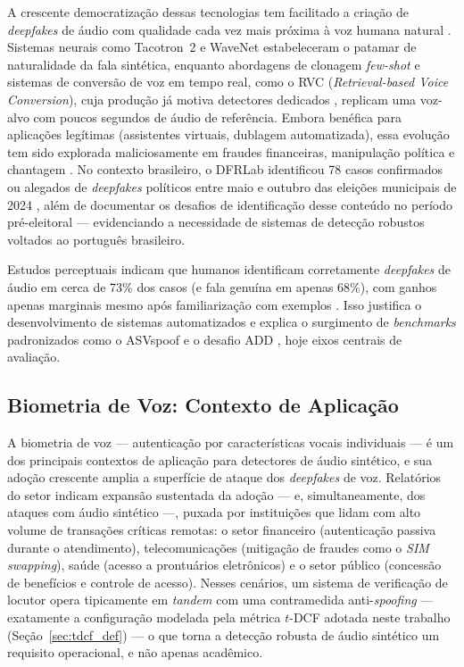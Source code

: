 \documentclass[12pt,a4paper]{article}
\begin{document}
A crescente democratização dessas tecnologias tem facilitado a criação de
\textit{deepfakes} de áudio com qualidade cada vez mais próxima à voz humana
natural \cite{mai2023warning, heidari2024deepfake}. Sistemas neurais como
Tacotron~2 \cite{shen2018natural} e WaveNet \cite{oord2016wavenet}
estabeleceram o patamar de naturalidade da fala sintética, enquanto abordagens
de clonagem \textit{few-shot} \cite{jia2018, wang2023vall} e sistemas de
conversão de voz em tempo real, como o RVC (\textit{Retrieval-based Voice
Conversion}), cuja produção já motiva detectores dedicados
\cite{bird2023realtime}, replicam uma voz-alvo com poucos segundos de áudio de
referência. Embora benéfica para aplicações legítimas (assistentes virtuais,
dublagem automatizada), essa evolução tem sido explorada maliciosamente em
fraudes financeiras, manipulação política e chantagem
\cite{pindrop2025, dfrlab2024}. No contexto brasileiro, o DFRLab identificou
\num{78} casos confirmados ou alegados de \textit{deepfakes} políticos entre
maio e outubro das eleições municipais de 2024 \cite{dfrlab2024}, além de
documentar os desafios de identificação desse conteúdo no período
pré-eleitoral \cite{farrugia2024} --- evidenciando a necessidade de sistemas
de detecção robustos voltados ao português brasileiro.

Estudos perceptuais indicam que humanos identificam corretamente
\textit{deepfakes} de áudio em cerca de \num{73}\% dos casos (e fala genuína em
apenas \num{68}\%), com ganhos apenas marginais mesmo após familiarização com
exemplos \cite{mai2023warning}. Isso justifica o
desenvolvimento de sistemas automatizados e explica o surgimento de
\textit{benchmarks} padronizados como o ASVspoof
\cite{todisco2019asvspoof, yamagishi2021asvspoof, wang2024asvspoof5} e o desafio
ADD \cite{yi2022add}, hoje eixos centrais de avaliação.

\subsection{Biometria de Voz: Contexto de Aplicação}
\label{sec:biometria_voz}

A biometria de voz --- autenticação por características vocais individuais ---
é um dos principais contextos de aplicação para detectores de áudio sintético,
e sua adoção crescente amplia a superfície de ataque dos \textit{deepfakes} de
voz. Relatórios do setor indicam expansão sustentada da adoção --- e,
simultaneamente, dos ataques com áudio sintético \cite{pindrop2025} ---, puxada
por instituições que lidam com alto volume de transações críticas remotas: o
setor financeiro (autenticação passiva durante o atendimento),
telecomunicações (mitigação de fraudes como o \textit{SIM swapping}), saúde
(acesso a prontuários eletrônicos) e o setor público (concessão de benefícios
e controle de acesso). Nesses cenários, um sistema de verificação de locutor
opera tipicamente em \textit{tandem} com uma contramedida anti-\textit{spoofing}
--- exatamente a configuração modelada pela métrica $t$-DCF adotada neste
trabalho (Seção~\ref{sec:tdcf_def}) --- o que torna a detecção robusta de
áudio sintético um requisito operacional, e não apenas acadêmico.
\end{document}
